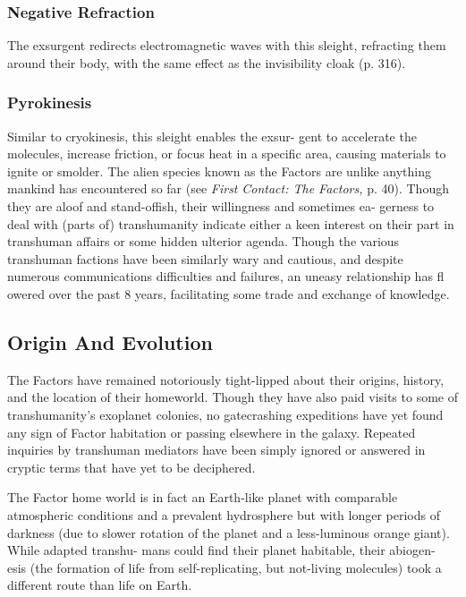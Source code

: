 \subsubsection{Negative Refraction}

The exsurgent redirects electromagnetic waves with 
this sleight, refracting them around their body, with 
the same effect as the invisibility cloak (p. 316).

\subsubsection{Pyrokinesis}

Similar to cryokinesis, this sleight enables the exsur-
gent to accelerate the molecules, increase friction, or 
focus heat in a specific area, causing materials to ignite 
or smolder.
The alien species known as the Factors are unlike 
anything mankind has encountered so far (see \textit{First }
\textit{Contact: The Factors,} p. 40). Though they are aloof 
and stand-offish, their willingness and sometimes ea-
gerness to deal with (parts of) transhumanity indicate 
either a keen interest on their part in transhuman 
affairs or some hidden ulterior agenda. Though the 
various transhuman factions have been similarly wary 
and cautious, and despite numerous communications 
difficulties and failures, an uneasy relationship has 
fl owered over the past 8 years, facilitating some trade 
and exchange of knowledge.

\subsection{Origin And Evolution }

The Factors have remained notoriously tight-lipped 
about their origins, history, and the location of their 
homeworld. Though they have also paid visits to some 
of transhumanity's exoplanet colonies, no gatecrashing 
expeditions have yet found any sign of Factor habitation 
or passing elsewhere in the galaxy. Repeated inquiries 
by transhuman mediators have been simply ignored or 
answered in cryptic terms that have yet to be deciphered.

The Factor home world is in fact an Earth-like 
planet with comparable atmospheric conditions and 
a prevalent hydrosphere but with longer periods of 
darkness (due to slower rotation of the planet and a 
less-luminous orange giant). While adapted transhu-
mans could find their planet habitable, their abiogen-
esis (the formation of life from self-replicating, but 
not-living molecules) took a different route than life 
on Earth. 

